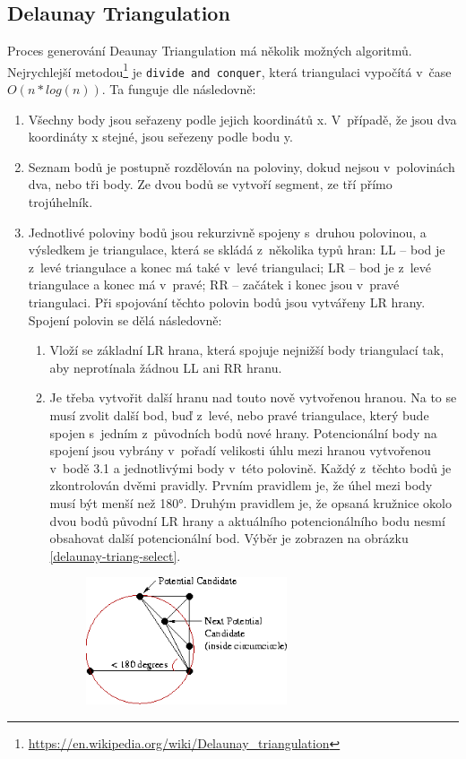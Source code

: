\subsection*{Delaunay Triangulation}
Proces generování Deaunay Triangulation má několik možných algoritmů. Nejrychlejší metodou\footnote{\href{https://en.wikipedia.org/wiki/Delaunay_triangulation\#Divide_and_conquer}{https://en.wikipedia.org/wiki/Delaunay\_triangulation}} je \verb|divide and conquer|, která triangulaci vypočítá v~čase $O(n*log(n))$. Ta funguje dle \cite{delaunay} následovně:
\begin{enumerate}[label*=\arabic*.]
    \item Všechny body jsou seřazeny podle jejich koordinátů x. V~případě, že jsou dva koordináty x stejné, jsou seřezeny podle bodu y.
    \item Seznam bodů je postupně rozdělován na poloviny, dokud nejsou v~polovinách dva, nebo tři body. Ze dvou bodů se vytvoří segment, ze tří přímo trojúhelník.
    \item Jednotlivé poloviny bodů jsou rekurzivně spojeny s~druhou polovinou, a výsledkem je triangulace, která se skládá z~několika typů hran: LL -- bod je z~levé triangulace a konec má také v~levé triangulaci; LR -- bod je z~levé triangulace a konec má v~pravé; RR -- začátek i konec jsou v~pravé triangulaci. Při spojování těchto polovin bodů jsou vytvářeny LR hrany. Spojení polovin se dělá následovně:
    \begin{enumerate}[label*=\arabic*.]
        \item Vloží se základní LR hrana, která spojuje nejnižší body triangulací tak, aby neprotínala žádnou LL ani RR hranu.
    \item Je třeba vytvořit další hranu nad touto nově vytvořenou hranou. Na to se musí zvolit další bod, buď z~levé, nebo pravé triangulace, který bude spojen s~jedním z~původních bodů nové hrany. Potencionální body na spojení jsou vybrány v~pořadí velikosti úhlu mezi hranou vytvořenou v~bodě 3.1 a jednotlivými body v~této polovině. Každý z~těchto bodů je zkontrolován dvěmi pravidly. Prvním pravidlem je, že úhel mezi body musí být menší než 180°. Druhým pravidlem je, že opsaná kružnice okolo dvou bodů původní LR hrany a aktuálního potencionálního bodu nesmí obsahovat další potencionální bod. Výběr je zobrazen na obrázku \ref{delaunay-triang-select}.
        \begin{figure}[H]
	\centering
	\includegraphics[width=16em]{images/triangulation/bad_pot_cand.png}

\end{figure}
\end{enumerate}
\end{enumerate}
